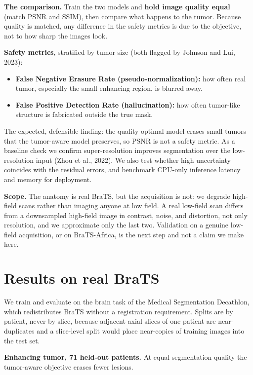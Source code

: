 \documentclass[11pt,a4paper]{article}
\begin{document}
\textbf{The comparison.} Train the two models and \textbf{hold image quality equal} (match PSNR and SSIM), then compare what happens to the tumor. Because quality is matched, any difference in the safety metrics is due to the objective, not to how sharp the images look.

\textbf{Safety metrics}, stratified by tumor size (both flagged by Johnson and Lui, 2023):
\begin{itemize}
  \item \textbf{False Negative Erasure Rate (pseudo-normalization):} how often real tumor, especially the small enhancing region, is blurred away.
  \item \textbf{False Positive Detection Rate (hallucination):} how often tumor-like structure is fabricated outside the true mask.
\end{itemize}
The expected, defensible finding: the quality-optimal model erases small tumors that the tumor-aware model preserves, so PSNR is not a safety metric. As a baseline check we confirm super-resolution improves segmentation over the low-resolution input (Zhou et al., 2022). We also test whether high uncertainty coincides with the residual errors, and benchmark CPU-only inference latency and memory for deployment.

\textbf{Scope.} The anatomy is real BraTS, but the acquisition is not: we degrade high-field scans rather than imaging anyone at low field. A real low-field scan differs from a downsampled high-field image in contrast, noise, and distortion, not only resolution, and we approximate only the last two. Validation on a genuine low-field acquisition, or on BraTS-Africa, is the next step and not a claim we make here.

\section*{Results on real BraTS}

We train and evaluate on the brain task of the Medical Segmentation Decathlon, which redistributes BraTS without a registration requirement. Splits are by patient, never by slice, because adjacent axial slices of one patient are near-duplicates and a slice-level split would place near-copies of training images into the test set.

\textbf{Enhancing tumor, 71 held-out patients.} At equal segmentation quality the tumor-aware objective erases fewer lesions.
\end{document}
